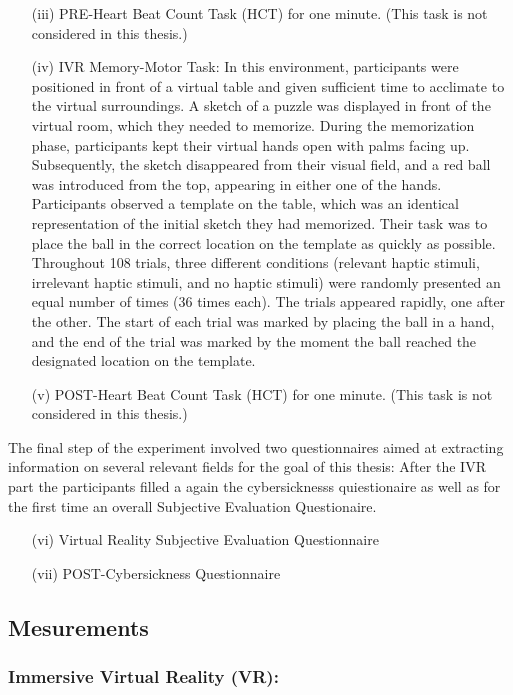 \documentclass[12pt,oneside,openright]{report}
\begin{document}
\begin{enumerate}
\item[(iii)] PRE-Heart Beat Count Task (HCT) for one minute. (This task is not considered in this thesis.)
\item[(iv)] IVR Memory-Motor Task: In this environment, participants were positioned in front of a virtual table and given sufficient time to acclimate to the virtual surroundings. A sketch of a puzzle was displayed in front of the virtual room, which they needed to memorize. During the memorization phase, participants kept their virtual hands open with palms facing up. Subsequently, the sketch disappeared from their visual field, and a red ball was introduced from the top, appearing in either one of the hands. Participants observed a template on the table, which was an identical representation of the initial sketch they had memorized. Their task was to place the ball in the correct location on the template as quickly as possible. Throughout 108 trials, three different conditions (relevant haptic stimuli, irrelevant haptic stimuli, and no haptic stimuli) were randomly presented an equal number of times (36 times each). The trials appeared rapidly, one after the other. The start of each trial was marked by placing the ball in a hand, and the end of the trial was marked by the moment the ball reached the designated location on the template.
\item[(v)] POST-Heart Beat Count Task (HCT) for one minute. (This task is not considered in this thesis.)
\end{enumerate}

The final step of the experiment involved two questionnaires aimed at extracting information on several relevant fields for the goal of this thesis:
After the IVR part the participants filled a again the cybersicknesss quiestionaire as well as for the first time an overall Subjective Evaluation Questionaire.
\begin{enumerate}
    \item[(vi)] Virtual Reality Subjective Evaluation Questionnaire
    \item[(vii)] POST-Cybersickness Questionnaire
\end{enumerate}
    \subsection*{Mesurements}
    \subsubsection*{Immersive Virtual Reality (VR):}
\end{document}
